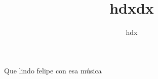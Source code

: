 \documentclass[12pt,a4paper]{article}
\author{hdx}
\title{hdxdx}
\begin{document}
\maketitle

Que lindo felipe con esa música
\end{document}

